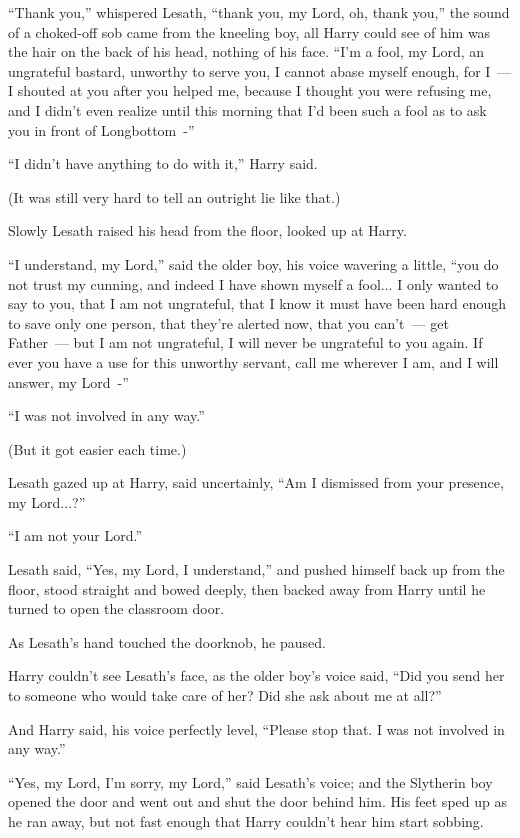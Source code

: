 ``Thank you,'' whispered Lesath, ``thank you, my Lord, oh, thank you,'' the sound of a choked-off sob came from the kneeling boy, all Harry could see of him was the hair on the back of his head, nothing of his face. ``I'm a fool, my Lord, an ungrateful bastard, unworthy to serve you, I cannot abase myself enough, for I~--- I shouted at you after you helped me, because I thought you were refusing me, and I didn't even realize until this morning that I'd been such a fool as to ask you in front of Longbottom~-''

``I didn't have anything to do with it,'' Harry said.

(It was still very hard to tell an outright lie like that.)

Slowly Lesath raised his head from the floor, looked up at Harry.

``I understand, my Lord,'' said the older boy, his voice wavering a little, ``you do not trust my cunning, and indeed I have shown myself a fool... I only wanted to say to you, that I am not ungrateful, that I know it must have been hard enough to save only one person, that they're alerted now, that you can't~--- get Father~--- but I am not ungrateful, I will never be ungrateful to you again. If ever you have a use for this unworthy servant, call me wherever I am, and I will answer, my Lord~-''

``I was not involved in any way.''

(But it got easier each time.)

Lesath gazed up at Harry, said uncertainly, ``Am I dismissed from your presence, my Lord...?''

``I am not your Lord.''

Lesath said, ``Yes, my Lord, I understand,'' and pushed himself back up from the floor, stood straight and bowed deeply, then backed away from Harry until he turned to open the classroom door.

As Lesath's hand touched the doorknob, he paused.

Harry couldn't see Lesath's face, as the older boy's voice said, ``Did you send her to someone who would take care of her? Did she ask about me at all?''

And Harry said, his voice perfectly level, ``Please stop that. I was not involved in any way.''

``Yes, my Lord, I'm sorry, my Lord,'' said Lesath's voice; and the Slytherin boy opened the door and went out and shut the door behind him. His feet sped up as he ran away, but not fast enough that Harry couldn't hear him start sobbing.

